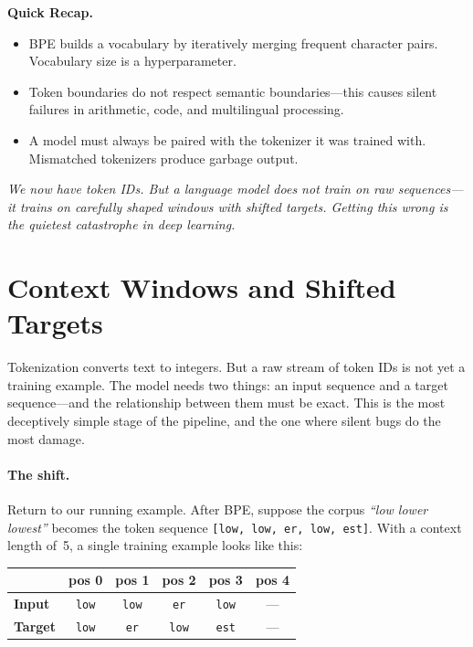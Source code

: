 \begin{quickrecap}
\textbf{Quick Recap.}
\begin{itemize}[nosep,leftmargin=1.5em]
  \item BPE builds a vocabulary by iteratively merging frequent character pairs. Vocabulary size is a hyperparameter.
  \item Token boundaries do not respect semantic boundaries---this causes silent failures in arithmetic, code, and multilingual processing.
  \item A model must always be paired with the tokenizer it was trained with. Mismatched tokenizers produce garbage output.
\end{itemize}
\textit{We now have token IDs. But a language model does not train on raw sequences---it trains on carefully shaped windows with shifted targets. Getting this wrong is the quietest catastrophe in deep learning.}
\end{quickrecap}


\section{Context Windows and Shifted Targets}

Tokenization converts text to integers. But a raw stream of token IDs is not yet a training example. The model needs two things: an input sequence and a target sequence---and the relationship between them must be exact. This is the most deceptively simple stage of the pipeline, and the one where silent bugs do the most damage.

\paragraph{The shift.} Return to our running example. After BPE, suppose the corpus \emph{``low lower lowest''} becomes the token sequence \texttt{[low, \textvisiblespace low, er, \textvisiblespace low, est]}. With a context length of~5, a single training example looks like this:

\begin{center}
\begin{tabular}{lccccc}
\toprule
& pos 0 & pos 1 & pos 2 & pos 3 & pos 4 \\
\midrule
\textbf{Input}  & \texttt{low} & \texttt{\textvisiblespace low} & \texttt{er} & \texttt{\textvisiblespace low} & --- \\
\textbf{Target} & \texttt{\textvisiblespace low} & \texttt{er} & \texttt{\textvisiblespace low} & \texttt{est} & --- \\
\bottomrule
\end{tabular}
\end{center}

